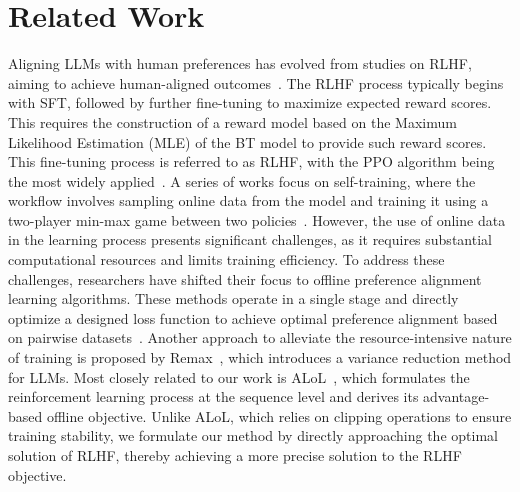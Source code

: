 \section{Related Work}
Aligning LLMs with human preferences has evolved from studies on RLHF, aiming to achieve human-aligned outcomes~\cite{stiennon2020learning,ouyang2022traininglanguagemodelsfollow,bai2022training,lee2023rlaif}. The RLHF process typically begins with SFT, followed by further fine-tuning to maximize expected reward scores. This requires the construction of a reward model based on the Maximum Likelihood Estimation (MLE) of the BT model to provide such reward scores. This fine-tuning process is referred to as RLHF, with the PPO algorithm being the most widely applied~\cite{schulman2017proximalpolicyoptimizationalgorithms}. A series of works focus on self-training, where the workflow involves sampling online data from the model and training it using a two-player min-max game between two policies~\cite{rosset2024directnashoptimizationteaching,swamy2024minimaximalistapproachreinforcementlearning,chen2024selfplayfinetuningconvertsweak}. However, the use of online data in the learning process presents significant challenges, as it requires substantial computational resources and limits training efficiency.
%
To address these challenges, researchers have shifted their focus to offline preference alignment learning algorithms. These methods operate in a single stage and directly optimize a designed loss function to achieve optimal preference alignment based on pairwise datasets~\cite{zhao2023slic,rafailov2024direct,azar2024general,ethayarajh2024ktomodelalignmentprospect,xu2024contrastivepreferenceoptimizationpushing}. Another approach to alleviate the resource-intensive nature of training is proposed by Remax~\cite{li2024remaxsimpleeffectiveefficient}, which introduces a variance reduction method for LLMs.
%
Most closely related to our work is ALoL~\cite{bahetileftover}, which formulates the reinforcement learning process at the sequence level and derives its advantage-based offline objective. Unlike ALoL, which relies on clipping operations to ensure training stability, we formulate our method by directly approaching the optimal solution of RLHF, thereby achieving a more precise solution to the RLHF objective.
